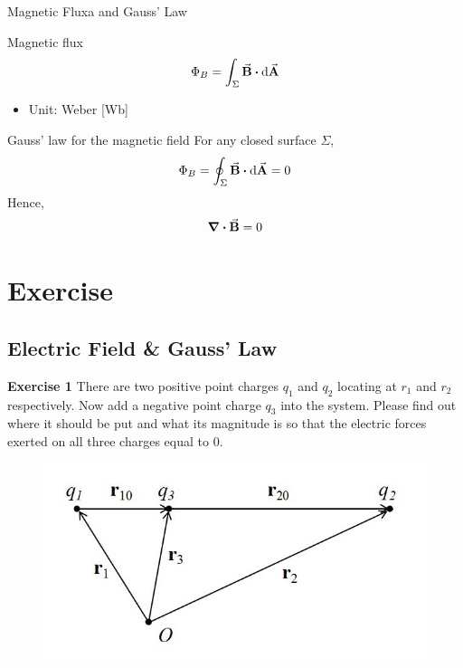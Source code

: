 \documentclass{beamer}
\begin{document}
\begin{frame}{Magnetic Fluxa and Gauss' Law}
    \begin{block}{Magnetic flux}
        \begin{equation}
            \Phi_B = \int_\Sigma \va{B} \vdot \dd{\va{A}}
        \end{equation}
    \end{block}
    \begin{itemize}
        \item Unit: Weber [Wb]
    \end{itemize}
    \vfill
    \begin{block}{Gauss' law for the magnetic field}
        For any closed surface $\Sigma$,
        \begin{equation}
            \Phi_B = \oint_\Sigma \va{B} \vdot \dd{\va{A}} = 0
        \end{equation}
        Hence,
        \begin{equation}
            \div{\va{B}} = 0
        \end{equation}
    \end{block}
\end{frame}




\section{Exercise}

\subsection{\bf Electric Field \& Gauss' Law}

\begin{frame}{\bf Exercise 1}
There are two positive point charges $q_1$ and $q_2$ locating at 
$r_1$ and $r_2$ respectively. Now add a negative point charge $q_3$ 
into the system. Please find out where it should be put and 
what its magnitude is so that the electric forces exerted on 
all three charges equal to 0.

\begin{figure}[htbp]
    \centering
    \includegraphics[scale = 0.8]{images/EF_1.jpg}
\end{figure}
\end{frame}
\end{document}

